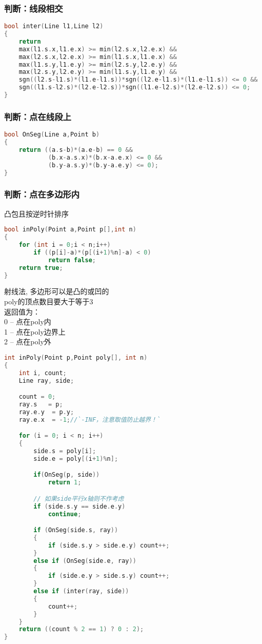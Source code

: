 	\subsubsection{判断：线段相交}
		\begin{lstlisting}[language=c++]
bool inter(Line l1,Line l2)
{
	return 
	max(l1.s.x,l1.e.x) >= min(l2.s.x,l2.e.x) &&
	max(l2.s.x,l2.e.x) >= min(l1.s.x,l1.e.x) &&
	max(l1.s.y,l1.e.y) >= min(l2.s.y,l2.e.y) &&
	max(l2.s.y,l2.e.y) >= min(l1.s.y,l1.e.y) &&
	sgn((l2.s-l1.s)*(l1.e-l1.s))*sgn((l2.e-l1.s)*(l1.e-l1.s)) <= 0 &&
	sgn((l1.s-l2.s)*(l2.e-l2.s))*sgn((l1.e-l2.s)*(l2.e-l2.s)) <= 0;
}
		\end{lstlisting}
	
	\subsubsection{判断：点在线段上}
		\begin{lstlisting}[language=c++]
bool OnSeg(Line a,Point b)
{
	return ((a.s-b)*(a.e-b) == 0 &&
			(b.x-a.s.x)*(b.x-a.e.x) <= 0 &&
			(b.y-a.s.y)*(b.y-a.e.y) <= 0);
}
		\end{lstlisting}
		
	\subsubsection{判断：点在多边形内}
		凸包且按逆时针排序
		\begin{lstlisting}[language=c++]
bool inPoly(Point a,Point p[],int n)
{
	for (int i = 0;i < n;i++)
		if ((p[i]-a)*(p[(i+1)%n]-a) < 0)
			return false;
	return true;
}
		\end{lstlisting}
		射线法, 多边形可以是凸的或凹的\\
		poly的顶点数目要大于等于3\\
		返回值为：\\
		0  -- 点在poly内\\
		1  -- 点在poly边界上\\
		2  -- 点在poly外
		\begin{lstlisting}[language=c++]
int inPoly(Point p,Point poly[], int n)
{
	int i, count;
	Line ray, side;

	count = 0;
	ray.s	= p;
	ray.e.y  = p.y;
	ray.e.x  = -1;//`-INF，注意取值防止越界！`

	for (i = 0; i < n; i++)
	{
		side.s = poly[i];
		side.e = poly[(i+1)%n];

		if(OnSeg(p, side))
			return 1;

		// 如果side平行x轴则不作考虑
		if (side.s.y == side.e.y)
			continue;

		if (OnSeg(side.s, ray))
		{
			if (side.s.y > side.e.y) count++;
		}
		else if (OnSeg(side.e, ray))
		{
			if (side.e.y > side.s.y) count++;
		}
		else if (inter(ray, side))
		{
			count++;
		}
	}
	return ((count % 2 == 1) ? 0 : 2);
}
		\end{lstlisting}
		
